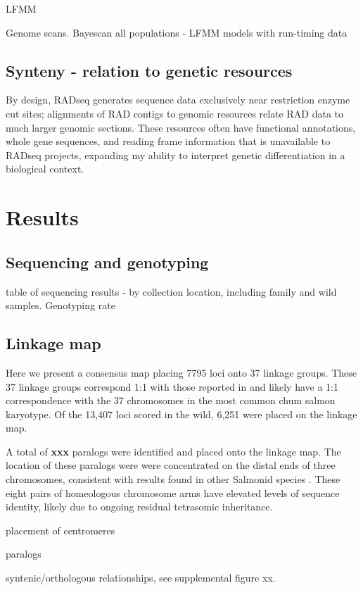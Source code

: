\documentclass[12pt, one column]{article}
\begin{document}
LFMM 

Genome scans.  Bayescan all populations - LFMM models with run-timing data

\subsection*{Synteny - relation to genetic resources}
By design, RADseq generates sequence data exclusively near restriction enzyme cut sites; alignments of RAD contigs to genomic resources relate RAD data to much larger genomic sections.  These resources often have functional annotations, whole gene sequences, and reading frame information that is unavailable to RADseq projects, expanding my ability to interpret genetic differentiation in a biological context.


\section*{Results}
\subsection*{Sequencing and genotyping}
table of sequencing results -  by collection location, including family and wild samples.
Genotyping rate

\subsection*{Linkage map}
Here we present a consensus map placing 7795 loci onto 37 linkage groups.  These 37 linkage groups correspond 1:1 with those reported in \citep{Waples2015} and likely have a 1:1 correspondence with the 37 chromosomes in the most common chum salmon karyotype\citep{Phillips2001}. Of the 13,407 loci scored in the wild, 6,251 were placed on the linkage map. 

A total of \textbf{xxx} paralogs were identified and placed onto the linkage map.  The location of these paralogs were were concentrated on the distal ends of three chromosomes, consistent with results found in other Salmonid species  \citep{Brieuc2014, Kodama2014, Waples2015}. These eight pairs of homeologous chromosome arms have elevated levels of sequence identity, likely due to ongoing residual tetrasomic inheritance.

placement of centromeres

paralogs

syntenic/orthologous relationships, see supplemental figure xx.
\end{document}

